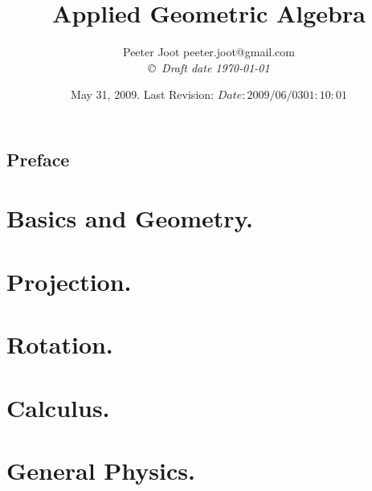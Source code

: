 \documentclass[12pt,leqno]{book}
\title{Applied Geometric Algebra}
\author{Peeter Joot  \quad peeter.joot@gmail.com \\
{\small\em \copyright \  Draft date \today }}
\date{ May 31, 2009.  Last Revision: $Date: 2009/06/03 01:10:01 $ }
\begin{document}
\maketitle
\tableofcontents
\listoffigures
\listoftables
\chapter*{Preface}\normalsize
\pagestyle{plain}


\pagestyle{headings}


\part{Basics and Geometry.}
















\part{Projection.}






\part{Rotation.}





\part{Calculus.}






\part{General Physics.}







\end{document}
